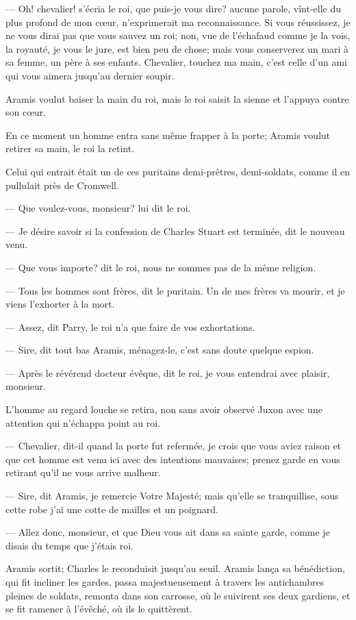— Oh! chevalier! s'écria le roi, que puis-je vous dire? aucune parole, vînt-elle du plus profond de mon cœur, n'exprimerait ma reconnaissance. Si vous réussissez, je ne vous dirai pas que vous sauvez un roi; non, vue de l'échafaud comme je la vois, la royauté, je vous le jure, est bien peu de chose; mais vous conserverez un mari à sa femme, un père à ses enfants. Chevalier, touchez ma main, c'est celle d'un ami qui vous aimera jusqu'au dernier soupir.

Aramis voulut baiser la main du roi, mais le roi saisit la sienne et l'appuya contre son cœur.

En ce moment un homme entra sans même frapper à la porte; Aramis voulut retirer sa main, le roi la retint.

Celui qui entrait était un de ces puritains demi-prêtres, demi-soldats, comme il en pullulait près de Cromwell.

— Que voulez-vous, monsieur? lui dit le roi.

— Je désire savoir si la confession de Charles Stuart est terminée, dit le nouveau venu.

— Que vous importe? dit le roi, nous ne sommes pas de la même religion.

— Tous les hommes sont frères, dit le puritain. Un de mes frères va mourir, et je viens l'exhorter à la mort.

— Assez, dit Parry, le roi n'a que faire de vos exhortations.

— Sire, dit tout bas Aramis, ménagez-le, c'est sans doute quelque espion.

— Après le révérend docteur évêque, dit le roi, je vous entendrai avec plaisir, monsieur.

L'homme au regard louche se retira, non sans avoir observé Juxon avec une attention qui n'échappa point au roi.

— Chevalier, dit-il quand la porte fut refermée, je crois que vous aviez raison et que cet homme est venu ici avec des intentions mauvaises; prenez garde en vous retirant qu'il ne vous arrive malheur.

— Sire, dit Aramis, je remercie Votre Majesté; mais qu'elle se tranquillise, sous cette robe j'ai une cotte de mailles et un poignard.

— Allez donc, monsieur, et que Dieu vous ait dans sa sainte garde, comme je disais du temps que j'étais roi.

Aramis sortit; Charles le reconduisit jusqu'au seuil. Aramis lança sa bénédiction, qui fit incliner les gardes, passa majestueusement à travers les antichambres pleines de soldats, remonta dans son carrosse, où le suivirent ses deux gardiens, et se fit ramener à l'évêché, où ils le quittèrent.

